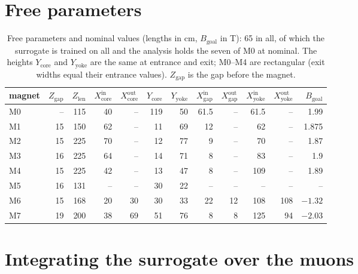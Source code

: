 \documentclass[11pt,a4paper]{article}
\begin{document}
\section{Free parameters}
\begin{table}[h]
\centering
\caption{Free parameters and nominal values (lengths in cm, $B_\mathrm{goal}$ in T): 65 in all, of which the
surrogate is trained on all and the analysis holds the seven of M0 at nominal. The heights
$Y_\mathrm{core}$ and $Y_\mathrm{yoke}$ are the same at entrance and exit; M0--M4 are rectangular
(exit widths equal their entrance values). $Z_\mathrm{gap}$ is the gap before the magnet.}
\label{tab:params}
\small
\setlength{\tabcolsep}{3.5pt}
\begin{tabular}{lrrrrrrrrrrr}
\toprule
magnet & $Z_\mathrm{gap}$ & $Z_\mathrm{len}$ & $X_\mathrm{core}^\mathrm{in}$ & $X_\mathrm{core}^\mathrm{out}$ & $Y_\mathrm{core}$ & $Y_\mathrm{yoke}$ & $X_\mathrm{gap}^\mathrm{in}$ & $X_\mathrm{gap}^\mathrm{out}$ & $X_\mathrm{yoke}^\mathrm{in}$ & $X_\mathrm{yoke}^\mathrm{out}$ & $B_\mathrm{goal}$ \\
\midrule
M0 &  --   & 115   & 40    & --    & 119   & 50    & 61.5  & --    & 61.5  & --     & 1.99 \\
M1 & 15    & 150   & 62    & --    & 11    & 69    & 12    & --    & 62    & --     & 1.875 \\
M2 & 15    & 225   & 70    & --    & 12    & 77    & 9     & --    & 70    & --     & 1.87 \\
M3 & 16    & 225   & 64    & --    & 14    & 71    & 8     & --    & 83    & --     & 1.9 \\
M4 & 15    & 225   & 42    & --    & 13    & 47    & 8     & --    & 109   & --     & 1.89 \\
M5 & 16    & 131   & --    & --    & 30    & 22    & --    & --    & --    & --     & -- \\
M6 & 15    & 168   & 20    & 30    & 30    & 33    & 22    & 12    & 108   & 108    & $-1.32$ \\
M7 & 19    & 200   & 38    & 69    & 51    & 76    & 8     & 8     & 125   & 94     & $-2.03$ \\
\bottomrule
\end{tabular}
\end{table}

\section{Integrating the surrogate over the muons}
\label{app:quadrature}
\end{document}
